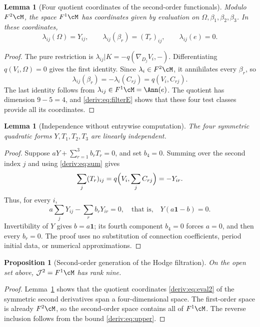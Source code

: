 \documentclass[11pt,a4paper,oneside]{article}
\theoremstyle{plain}
\newtheorem{proposition}[theorem]{Proposition}
\newtheorem{lemma}[theorem]{Lemma}
\theoremstyle{definition}
\theoremstyle{remark}
\numberwithin{equation}{section}
\begin{document}
\begin{lemma}[Four quotient coordinates of the second-order functionals]\label{deriv:lem:second}
Modulo $F^2\cM$, the space $F^1\cM$ has coordinates given by evaluation on $\Omega,\beta_1,\beta_2,\beta_3$.
In these coordinates,
\begin{equation}\label{deriv:eq:eval2}
 \lambda_{ij}(\Omega)=Y_{ij},\qquad
 \lambda_{ij}(\beta_r)=(T_r)_{ij},\qquad
 \lambda_{ij}(e)=0.
\end{equation}
\end{lemma}
\begin{proof}
The pure restriction is $\lambda_{ij}|K=-q(\nabla_{D_j}V_i,-)$.
Differentiating $q(V_i,\Omega)=0$ gives the first identity.
Since $\lambda_i\in F^2\cM$, it annihilates every $\beta_r$, so
\[
 \lambda_{ij}(\beta_r)=-\lambda_i(C_{rj})=q(V_i,C_{rj}).
\]
The last identity follows from $\lambda_{ij}\in F^1\cM=\Ann(e)$.
The quotient has dimension $9-5=4$, and \eqref{deriv:eq:filterE} shows that these four test classes provide all its coordinates.
\end{proof}

\begin{lemma}[Independence without entrywise computation]\label{deriv:lem:independent}
The four symmetric quadratic forms $Y,T_1,T_2,T_3$ are linearly independent.
\end{lemma}
\begin{proof}
Suppose $aY+\sum_{r=1}^3b_rT_r=0$, and set $b_4=0$.
Summing over the second index $j$ and using \eqref{deriv:eq:sum} gives
\[
 \sum_j(T_r)_{ij}
 =q\Bigl(V_i,\sum_jC_{rj}\Bigr)=-Y_{ir}.
\]
Thus, for every $i$,
\[
 a\sum_jY_{ij}-\sum_rb_rY_{ir}=0,
 \quad\text{that is,}\quad Y(a\mathbf1-b)=0.
\]
Invertibility of $Y$ gives $b=a\mathbf1$; its fourth component $b_4=0$ forces $a=0$, and then every $b_r=0$.
The proof uses no substitution of connection coefficients, period initial data, or numerical approximations.
\end{proof}

\begin{proposition}[Second-order generation of the Hodge filtration]\label{deriv:prop:jet2}
On the open set above, $\mathcal J^2=F^1\cM$ has rank nine.
\end{proposition}
\begin{proof}
Lemma~\ref{deriv:lem:independent} shows that the quotient coordinates \eqref{deriv:eq:eval2} of the symmetric second derivatives span a four-dimensional space.
The first-order space is already $F^2\cM$, so the second-order space contains all of $F^1\cM$. The reverse inclusion follows from the bound \eqref{deriv:eq:upper}.
\end{proof}
\end{document}

